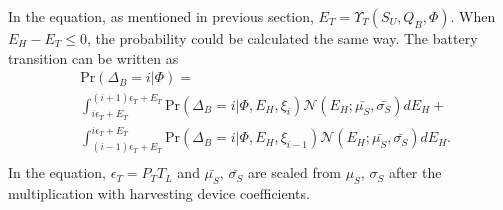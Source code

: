 \documentclass[journal,12pt,draftclsnofoot,onecolumn]{IEEEtran}
\begin{document}
In the equation, as mentioned in previous section, \(E_T = \Upsilon_T(S_U, Q_B, \Phi)\).
When \(E_H - E_T \le 0\), the probability could be calculated the same way.
The battery transition can be written as
\begin{equation}\label{battery}
\begin{aligned}
	&\mbox{Pr}\left(\Delta_B = i |\Phi\right) = \\
	&\int\nolimits_{i\epsilon_T + E_T}^{\left(i+1\right)\epsilon_T+ E_T}
	\mbox{Pr}\left(\Delta_B = i |\Phi, E_H, \xi_i\right) \mathcal{N}\left(E_H;\bar{\mu_S},\bar{\sigma_S}\right) dE_H+\\
	& \int_{\left(i-1\right)\epsilon_T+ E_T}^{i\epsilon_T + E_T}
	\mbox{Pr}\left(\Delta_B = i |\Phi, E_H, \xi_{i-1}\right) \mathcal{N}\left(E_H;\bar{\mu_S},\bar{\sigma_S}\right) dE_H.\\
\end{aligned}
\end{equation}
In the equation, \(\epsilon_T = P_TT_L\) and \(\bar{\mu_S},\,\bar{\sigma_S}\)
are scaled from \(\mu_S,\,\sigma_S\) after the multiplication with harvesting device coefficients.
\end{document}
